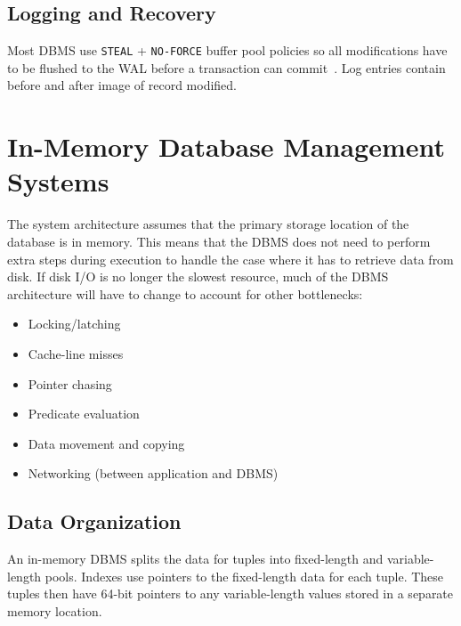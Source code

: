 \documentclass[11pt]{article}
\begin{document}
\subsection*{Logging and Recovery}
Most DBMS use \texttt{STEAL} + \texttt{NO-FORCE} buffer pool policies so all modifications 
have to be flushed to the WAL before a transaction can commit~\cite{franklin14}.
Log entries contain before and after image of record modified.


\section{In-Memory Database Management Systems}
The system architecture assumes that the primary storage location of the database is in 
memory. This means that the DBMS does not need to perform extra steps during execution to 
handle the case where it has to retrieve data from disk.
If disk I/O is no longer the slowest resource, much of the DBMS architecture will have to 
change to account for other bottlenecks:~\cite{stonebraker2007}
\begin{itemize}
    \item Locking/latching
    \item Cache-line misses
    \item Pointer chasing
    \item Predicate evaluation
    \item Data movement and copying
    \item Networking (between application and DBMS)
\end{itemize}
    
\subsection*{Data Organization}
An in-memory DBMS splits the data for tuples into fixed-length and variable-length pools. Indexes 
use pointers to the fixed-length data for each tuple. These tuples then have 64-bit pointers to any 
variable-length values stored in a separate memory location.
    
\end{document}
